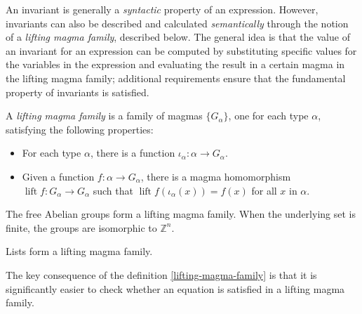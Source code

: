An invariant is generally a \emph{syntactic} property of an expression. However, invariants can also be described and calculated \emph{semantically} through the notion of a \emph{lifting magma family}, described below. The general idea is that the value of an invariant for an expression can be computed by substituting specific values for the variables in the expression and evaluating the result in a certain magma in the lifting magma family; additional requirements ensure that the fundamental property of invariants is satisfied.

\begin{definition}\label{lifting-magma-family}
	A \emph{lifting magma family} is a family of magmas $\{G_\alpha\}$, one for each type $\alpha$, satisfying the following properties:
	\begin{itemize}
		\item For each type $\alpha$, there is a function $\iota_\alpha : \alpha \to G_\alpha$.
		\item Given a function $f : \alpha \to G_\alpha$, there is a magma homomorphism $\operatorname{lift}{f} : G_\alpha \to G_\alpha$ such that $\operatorname{lift}{f}(\iota_\alpha(x)) = f(x)$ for all $x$ in $\alpha$.
	\end{itemize}
\end{definition}

\begin{example}
	The free Abelian groups form a lifting magma family. When the underlying set is finite, the groups are isomorphic to $\mathbb{Z}^n$.
\end{example}

\begin{example}
	Lists form a lifting magma family.
\end{example}

The key consequence of the definition \ref{lifting-magma-family} is that it is significantly easier to check whether an equation is satisfied in a lifting magma family.

